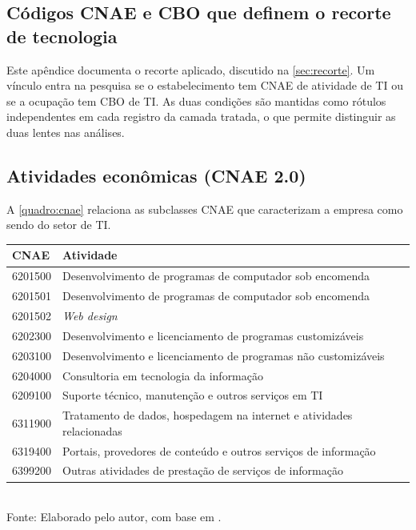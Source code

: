 
\begin{apendicesenv}

\chapter{Códigos CNAE e CBO que definem o recorte de tecnologia}
\label{apend:cbos}

Este apêndice documenta o recorte aplicado, discutido na \autoref{sec:recorte}. Um vínculo entra na pesquisa se o estabelecimento tem CNAE de atividade de TI ou se a ocupação tem CBO de TI. As duas condições são mantidas como rótulos independentes em cada registro da camada tratada, o que permite distinguir as duas lentes nas análises.

\section{Atividades econômicas (CNAE 2.0)}

A \autoref{quadro:cnae} relaciona as subclasses CNAE que caracterizam a empresa como sendo do setor de TI.

\begin{quadro}[H]
    \centering
    \caption{Subclasses CNAE que definem o setor de tecnologia}
    \label{quadro:cnae}
    \footnotesize
    \renewcommand{\arraystretch}{1.25}
    \begin{tabular}{lp{10.0cm}}
        \toprule
        \rowcolor{black!8}
        \textbf{CNAE} & \textbf{Atividade} \\
        \midrule
        6201500 & Desenvolvimento de programas de computador sob encomenda \\
        6201501 & Desenvolvimento de programas de computador sob encomenda \\
        6201502 & \textit{Web design} \\
        6202300 & Desenvolvimento e licenciamento de programas customizáveis \\
        6203100 & Desenvolvimento e licenciamento de programas não customizáveis \\
        6204000 & Consultoria em tecnologia da informação \\
        6209100 & Suporte técnico, manutenção e outros serviços em TI \\
        6311900 & Tratamento de dados, hospedagem na internet e atividades relacionadas \\
        6319400 & Portais, provedores de conteúdo e outros serviços de informação \\
        6399200 & Outras atividades de prestação de serviços de informação \\
        \bottomrule
    \end{tabular}
    \\[4pt]
    {\footnotesize Fonte: Elaborado pelo autor, com base em .}
\end{quadro}


\end{apendicesenv}
